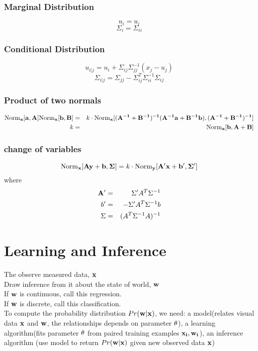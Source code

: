 \documentclass[12pt,a4paper]{article}
\begin{document}
\subsubsection*{Marginal Distribution}
$$
u_i = u_i
$$$$
\Sigma_i= \Sigma_{ii} 
$$
\subsubsection*{Conditional Distribution}
$$
u_{i|j} = u_i+\Sigma_{ij}\Sigma_{jj}^{-1}(x_j-u_j)
$$$$
\Sigma_{i|j} = \Sigma_{jj}-\Sigma_{ij}^T\Sigma_{ii}^{-1}\Sigma_{ij}
$$
\subsubsection*{Product of two normals}
\begin{eqnarray*}
{\rm Norm}_{\bf x}[{\bf a, A}]{\rm Norm}_{\bf x}[{\bf b, B}] &=& k \cdot {\rm Norm}_{\bf x}{\bf [(A^{-1}+B^{-1})^{-1}(A^{-1}a+B^{-1}b),(A^{-1}+B^{-1})^{-1}]}\\
k &=&{\rm Norm}_{\bf a}[{\bf b, A+B}]
\end{eqnarray*}
\subsubsection*{change of variables}
$$
{\rm Norm}_{\bf x}[{\bf Ay+b,\Sigma}] = k\cdot{\rm Norm}_{\bf y}[{\bf A'x+b',\Sigma'}]
$$
where 
\begin{eqnarray*}
\bf A' &=& \Sigma'A^T\Sigma^{-1}\\
b' &=& -\Sigma'A^T\Sigma^{-1}b \\
\Sigma &=& (A^T\Sigma^{-1}A)^{-1}\\
\end{eqnarray*}
\section*{Learning and Inference}
The observe measured data, $\bf x$\\
Draw inference from it about the state of world, $\bf w$\\
If $\bf w$ is continuous, call this regression.\\
If $\bf w$ is discrete, call this classification.\\
To compute the probability distribution $Pr({\bf w|x})$, we need: a model(relates visual data $\bf x$ and $\bf w$, the relationships depends on parameter $\bf \theta$), a learning algorithm(fits parameter $\bf \theta$ from paired training examples $\bf x_i,w_i$), an inference algorithm (use model to return $Pr({\bf w|x})$ given new observed data $\bf x$)
\end{document}

